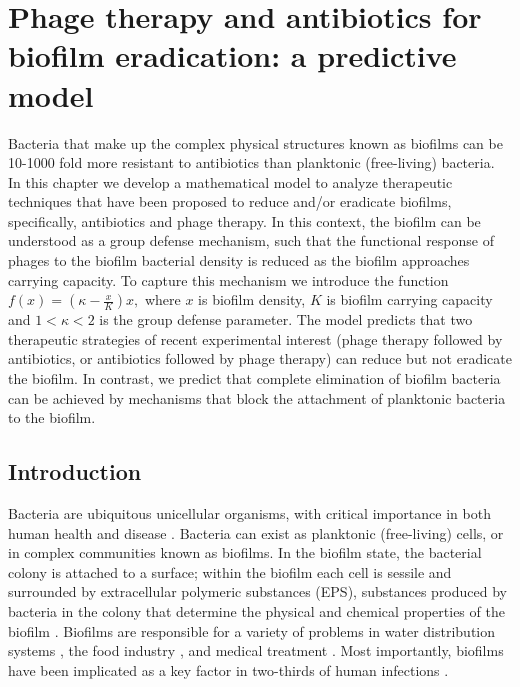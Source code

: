 \chapter{Phage therapy and antibiotics for biofilm eradication: a predictive model}
Bacteria that make up the complex physical structures known as biofilms can be 10-1000 fold more resistant to antibiotics than planktonic (free-living) bacteria.  In this chapter we develop a mathematical model to analyze therapeutic techniques that have been proposed to reduce and/or eradicate biofilms, specifically, antibiotics and phage therapy. In this context, the biofilm can be understood as a group defense mechanism, such that the functional response of phages to the biofilm bacterial density is reduced as the biofilm approaches carrying capacity. To capture this mechanism we introduce the function $f(x)=\left(\kappa-\frac{x}{K}\right)x,$ where $x$ is biofilm density, $K$ is biofilm carrying capacity and $1<\kappa <2$ is the group defense parameter. The model predicts that two therapeutic strategies of recent experimental interest (phage therapy followed by antibiotics, or antibiotics followed by phage therapy) can reduce but not eradicate the biofilm.  In contrast, we predict that complete elimination of biofilm bacteria can be achieved by mechanisms that block the attachment of planktonic bacteria to the biofilm.
\section{Introduction}
Bacteria are ubiquitous unicellular organisms, with critical importance in both human health and disease \citep{abedon_bacteriophage_2008}. Bacteria can exist as planktonic (free-living) cells, or in complex communities known as biofilms.  In the biofilm state, the bacterial colony is attached to a surface; within the biofilm each cell is sessile and surrounded by extracellular polymeric substances (EPS), substances produced by bacteria in the colony that determine the physical and chemical properties of the biofilm \citep{harper_bacteriophages_2014}. Biofilms are responsible for a variety of problems in water distribution systems \citep{douterelo_dynamics_2016}, the food industry \citep{van_houdt_biofilm_2010}, and medical treatment \citep{omar_microbial_2017, ciofu_antibiotic_2017}.  Most importantly, biofilms have been implicated as a key factor in two-thirds of human infections \citep{fux_bacterial_2003}. \\

